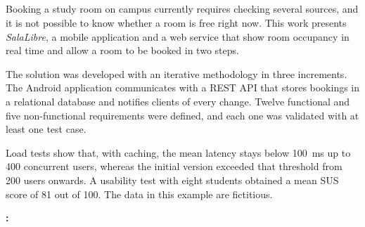 \begin{otherlanguage}{english}
\chapter*{\resumenname}

Booking a study room on campus currently requires checking several sources, and
it is not possible to know whether a room is free right now. This work presents
\emph{SalaLibre}, a mobile application and a web service that show room
occupancy in real time and allow a room to be booked in two steps.

The solution was developed with an iterative methodology in three increments.
The Android application communicates with a REST API that stores bookings in a
relational database and notifies clients of every change. Twelve functional and
five non-functional requirements were defined, and each one was validated with
at least one test case.

Load tests show that, with caching, the mean latency stays below \qty{100}{ms} up
to 400 concurrent users, whereas the initial version exceeded that threshold
from 200 users onwards. A usability test with eight students obtained a mean
SUS score of 81 out of 100.
The data in this example are fictitious.

\vspace{1em}
\noindent\textbf{\clavesname:} \tfgclavesEN
\end{otherlanguage}
\cleardoublepage
